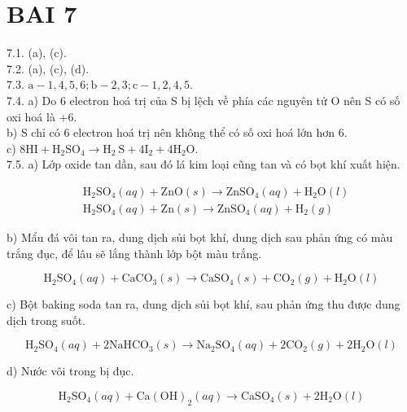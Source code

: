 \documentclass[10pt]{article}
\begin{document}
\section*{BAI 7}
7.1. (a), (c).\\
7.2. (a), (c), (d).\\
7.3. $\mathrm{a}-1,4,5,6 ; \mathrm{b}-2,3 ; \mathrm{c}-1,2,4,5$.\\
7.4. a) Do 6 electron hoá trị của S bị lệch về phía các nguyên tử O nên S có số oxi hoá là +6.\\
b) S chỉ có 6 electron hoá trị nên không thể có số oxi hoá lớn hơn 6.\\
c) $8 \mathrm{HI}+\mathrm{H}_{2} \mathrm{SO}_{4} \rightarrow \mathrm{H}_{2} \mathrm{~S}+4 \mathrm{I}_{2}+4 \mathrm{H}_{2} \mathrm{O}$.\\
7.5. a) Lớp oxide tan dần, sau đó lá kim loại cũng tan và có bọt khí xuất hiện.

$$
\begin{aligned}
& \mathrm{H}_{2} \mathrm{SO}_{4}(a q)+\mathrm{ZnO}(s) \rightarrow \mathrm{ZnSO}_{4}(a q)+\mathrm{H}_{2} \mathrm{O}(l) \\
& \mathrm{H}_{2} \mathrm{SO}_{4}(a q)+\mathrm{Zn}(s) \rightarrow \mathrm{ZnSO}_{4}(a q)+\mathrm{H}_{2}(g)
\end{aligned}
$$

b) Mẩu đá vôi tan ra, dung dịch sủi bọt khí, dung dịch sau phản ứng có màu trắng đục, để lâu sẽ lắng thành lớp bột màu trắng.

$$
\mathrm{H}_{2} \mathrm{SO}_{4}(a q)+\mathrm{CaCO}_{3}(s) \rightarrow \mathrm{CaSO}_{4}(s)+\mathrm{CO}_{2}(g)+\mathrm{H}_{2} \mathrm{O}(l)
$$

c) Bột baking soda tan ra, dung dịch sủi bọt khí, sau phản ứng thu được dung dịch trong suốt.

$$
\mathrm{H}_{2} \mathrm{SO}_{4}(a q)+2 \mathrm{NaHCO}_{3}(s) \rightarrow \mathrm{Na}_{2} \mathrm{SO}_{4}(a q)+2 \mathrm{CO}_{2}(g)+2 \mathrm{H}_{2} \mathrm{O}(l)
$$

d) Nước vôi trong bị đục.

$$
\mathrm{H}_{2} \mathrm{SO}_{4}(a q)+\mathrm{Ca}(\mathrm{OH})_{2}(a q) \rightarrow \mathrm{CaSO}_{4}(s)+2 \mathrm{H}_{2} \mathrm{O}(l)
$$
\end{document}
